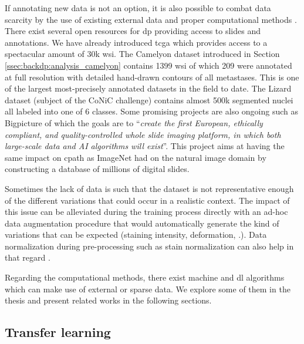 If annotating new data is not an option, it is also possible to combat data scarcity by the use of existing external data and proper computational methods \cite{van2019strategies}. There exist several open resources for \acrlong{dp} \cite{maree2019open} providing access to slides and annotations. We have already introduced \acrshort{tcga} which provides access to a spectacular amount of 30k \acrshort{wsi}. The Camelyon dataset introduced in Section \ref{ssec:backdp:analysis_camelyon} contains 1399 \acrshort{wsi} of which 209 were annotated at full resolution with detailed hand-drawn contours of all metastases. This is one of the largest most-precisely annotated datasets in the field to date. The Lizard dataset (subject of the CoNiC challenge) contains almost 500k segmented nuclei all labeled into one of 6 classes. Some promising projects are also ongoing such as Bigpicture \cite{moulin2021imi} of which the goals are to ``\textit{create the first European, ethically compliant, and quality-controlled whole slide imaging platform, in which both large-scale data and AI algorithms will exist}''. This project aims at having the same impact on \acrlong{cpath} as ImageNet had on the natural image domain by constructing a database of millions of digital slides.

Sometimes the lack of data is such that the dataset is not representative enough of the different variations that could occur in a realistic context. The impact of this issue can be alleviated during the training process directly with an ad-hoc data augmentation procedure that would automatically generate the kind of variations that can be expected (\eg staining intensity, deformation, \etc.). Data normalization during pre-processing such as stain normalization can also help in that regard \cite{kang2021stainnet, runz2021normalization, zhao2022restainnet}.

Regarding the computational methods, there exist machine and \acrlong{dl} algorithms which can make use of external or sparse data. We explore some of them in the thesis and present related works in the following sections. 

\subsection{Transfer learning}
\label{ssec:backdp:tl}

